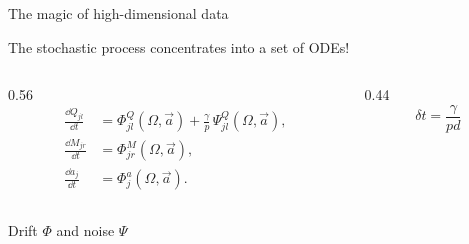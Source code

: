 \documentclass[aspectratio=169,11pt]{beamer}
\begin{document}
\begin{frame}{The magic of high-dimensional data}
  \begin{center}
    \large The stochastic process concentrates into a set of ODEs!
    \quad{}
  \end{center}
  \vspace{0.1em}
  \begin{columns}[c]
    \begin{column}{0.56\textwidth}
      \[
        \begin{aligned}
          \frac{\dd Q_{jl}}{\dd t} &= \Phi^{Q}_{jl}(\Omega, \vec{a})
            + \frac{\gamma}{p}\,\Psi^{Q}_{jl}(\Omega, \vec{a}), \\[0.2em]
          \frac{\dd M_{jr}}{\dd t} &= \Phi^{M}_{jr}(\Omega, \vec{a}), \\[0.2em]
          \frac{\dd a_{j}}{\dd t} &= \Phi^{a}_{j}(\Omega, \vec{a}).
        \end{aligned}
      \]
    \end{column}
    \begin{column}{0.44\textwidth}
      \centering
      \[ \delta t = \frac{\gamma}{pd} \]
      \vspace{-0.6em}
      \par
    \end{column}
  \end{columns}
  \vspace{0.15em}
  \begin{defbox}[top=3pt, bottom=2pt]{Drift $\Phi$ and noise $\Psi$
      }
\end{defbox}
\end{frame}
\end{document}
